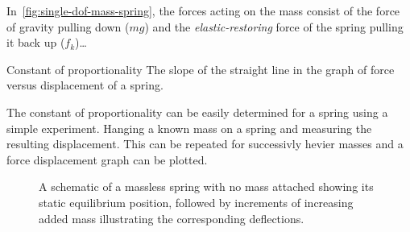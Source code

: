     In~\cref{fig:single-dof-mass-spring}, the forces acting on the mass consist of the force of gravity pulling down ($mg$) and the \textit{elastic-restoring} force of the spring pulling it back up ($f_k$)\dots

    \begin{fmd-definition}{Constant of proportionality}
      The slope of the straight line in the graph of force versus displacement of a spring.
    \end{fmd-definition}

    The constant of proportionality can be easily determined for a spring using a simple experiment. Hanging a known mass on a spring and measuring the resulting displacement. This can be repeated for successivly hevier masses and a force displacement graph can be plotted.

    \begin{figure}
      \caption{A schematic of a massless spring with no mass attached showing its static equilibrium position, followed by increments of increasing added mass illustrating the corresponding deflections.}\label{fig:spring-deflection} 
    \end{figure}

